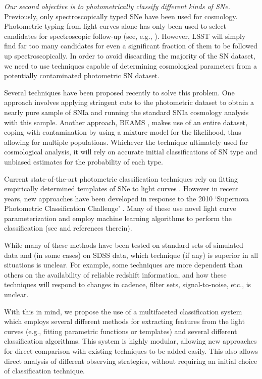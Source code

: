 {\emph{Our second objective is to photometrically classify different kinds of SNe.}} 
Previously, only spectroscopically typed SNe have been used for cosmology. Photometric 
typing from light curves alone has only been used to select candidates for spectroscopic 
follow-up (see, e.g., \citet{Sako2008}). However, LSST will simply find far too many 
candidates for even a significant fraction of them to be followed up spectroscopically. In order to avoid 
discarding the majority of the SN dataset, we need to use techniques capable of 
determining cosmological parameters from a potentially contaminated photometric SN dataset.

Several techniques have been proposed recently to solve this problem. One 
approach involves applying stringent cuts to the photometric dataset to obtain a nearly pure sample 
of SNIa \citep{Bernstein2012,Campbell2013} and running the standard SNIa cosmology analysis 
with this sample. Another approach, BEAMS \citep{Kunz2007,Newling2011,Hlozek2012,Knights2013}, 
makes use of an entire dataset, coping with contamination by using a mixture model for the 
likelihood, thus allowing for multiple populations. Whichever the technique ultimately used for 
cosmological analysis, it will rely on accurate initial classifications of SN type and 
unbiased estimates for the probability of each type.

Current state-of-the-art photometric classification techniques rely on
fitting empirically determined templates of SNe to light curves
\citep{Jha2007,Guy2007,Sako2011}. However in recent years, new approaches
have been developed in response to the 2010 `Supernova Photometric
Classification Challenge' \citep{Kessler2010a}. Many of these use novel
light curve parameterization and employ machine learning algorithms to
perform the classification (see \citet{Kessler2010b} and references
therein).

While many of these methods have been tested on standard sets of simulated data and (in some cases) 
on SDSS data, which technique (if any) is superior in all situations is unclear. For 
example, some techniques are more dependent than others on the availability of reliable redshift information, and how 
these techniques will respond to changes in cadence, filter sets, signal-to-noise, 
etc., is unclear.  

With this in mind, we propose the use of a multifaceted classification system which
employs several different methods for extracting features from the light curves (e.g.,
fitting parametric functions or templates) and several different classification
algorithms. This system is highly modular, allowing new approaches for direct comparison
with existing  techniques to be added easily. This also allows direct analysis of
different observing strategies, without requiring an initial choice of classification
technique.


